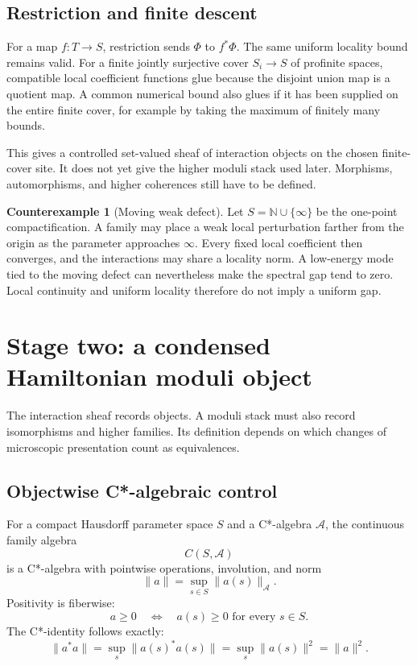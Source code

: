 \documentclass[12pt]{article}
\theoremstyle{definition}
\newtheorem{counterexample}[theorem]{Counterexample}
\theoremstyle{remark}
\newcommand{\A}{\mathcal A}
\begin{document}
\subsection{Restriction and finite descent}

For a map $f:T\to S$, restriction sends $\Phi$ to $f^*\Phi$.  The same
uniform locality bound remains valid.  For a finite jointly surjective cover
$S_i\to S$ of profinite spaces, compatible local coefficient functions glue
because the disjoint union map is a quotient map.  A common numerical bound
also glues if it has been supplied on the entire finite cover, for example by
taking the maximum of finitely many bounds.

This gives a controlled set-valued sheaf of interaction objects on the
chosen finite-cover site.  It does not yet give the higher moduli stack used
later.  Morphisms, automorphisms, and higher coherences still have to be
defined.

\begin{counterexample}[Moving weak defect]
Let $S=\mathbb N\cup\{\infty\}$ be the one-point compactification.  A family
may place a weak local perturbation farther from the origin as the parameter
approaches $\infty$.  Every fixed local coefficient then converges, and the
interactions may share a locality norm.  A low-energy mode tied to the moving
defect can nevertheless make the spectral gap tend to zero.  Local
continuity and uniform locality therefore do not imply a uniform gap.
\end{counterexample}

\section{Stage two: a condensed Hamiltonian moduli object}

The interaction sheaf records objects.  A moduli stack must also record
isomorphisms and higher families.  Its definition depends on which changes
of microscopic presentation count as equivalences.

\subsection{Objectwise C*-algebraic control}

For a compact Hausdorff parameter space $S$ and a C*-algebra $\A$, the
continuous family algebra
\begin{equation}
C(S,\A)
\end{equation}
is a C*-algebra with pointwise operations, involution, and norm
\begin{equation}
\|a\|=\sup_{s\in S}\|a(s)\|_{\A}.
\end{equation}
Positivity is fiberwise:
\begin{equation}
a\ge0
\quad\Longleftrightarrow\quad
a(s)\ge0\text{ for every }s\in S.
\label{eq:fiberwise-positive}
\end{equation}
The C*-identity follows exactly:
\begin{equation}
\|a^*a\|
=
\sup_s\|a(s)^*a(s)\|
=
\sup_s\|a(s)\|^2
=
\|a\|^2.
\label{eq:family-cstar}
\end{equation}
\end{document}
